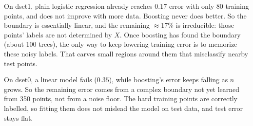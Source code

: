 \documentclass[11pt]{article}
\begin{document}
\noindent On dset1, plain logistic regression already reaches $0.17$ error with only 80 training points,
and does not improve with more data. Boosting never does better. So the boundary is essentially
linear, and the remaining $\approx17\%$ is irreducible: those points' labels are not determined by $X$.
Once boosting has found the boundary (about 100 trees), the only way to keep lowering training error is
to memorize these noisy labels. That carves small regions around them that misclassify nearby test
points.

On dset0, a linear model fails ($0.35$), while boosting's error keeps falling as $n$ grows. So the
remaining error comes from a complex boundary not yet learned from 350 points, not from a noise floor.
The hard training points are correctly labelled, so fitting them does not mislead the model on test
data, and test error stays flat.
\end{document}
